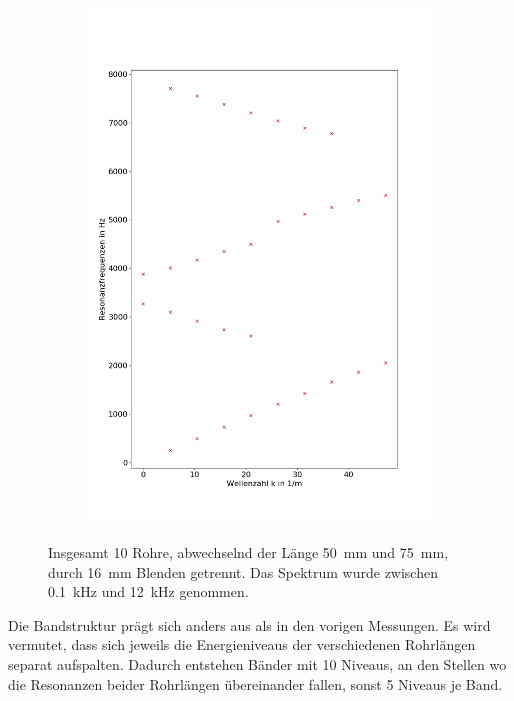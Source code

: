 \begin{figure}
\begin{subfigure}{0.34\textwidth}
\includegraphics[width=\textwidth]{content/Scripts/4b_6.jpg}
\end{subfigure}
\caption{Insgesamt 10 Rohre, abwechselnd der Länge 50~mm und 75~mm, durch 16~mm Blenden getrennt. Das Spektrum wurde zwischen 0.1~kHz und 12~kHz genommen.}
\label{fig:4b_6}
\end{figure}
Die Bandstruktur prägt sich anders aus als in den vorigen Messungen.  
Es wird vermutet, dass sich jeweils die Energieniveaus der verschiedenen Rohrlängen separat aufspalten.
Dadurch entstehen Bänder mit 10 Niveaus, an den Stellen wo die Resonanzen beider Rohrlängen übereinander fallen, sonst 5 Niveaus je Band.
\FloatBarrier
